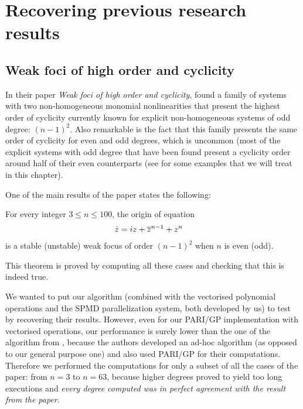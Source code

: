 \chapter{Recovering previous research results}

\section{Weak foci of high order and cyclicity \parencite{Liang2016}}

In their paper \emph{Weak foci of high order and cyclicity}, \textcite{Liang2016} found a family of systems with two non-homogeneous monomial nonlinearities that present the highest order of cyclicity currently known for explicit non-homogeneous systems of odd degree: $(n-1)^2$. Also remarkable is the fact that this family presents the same order of cyclicity for even and odd degrees, which is uncommon (most of the explicit systems with odd degree that have been found present a cyclicity order around half of their even counterparts (see  for some examples that we will treat in this chapter).

One of the main results of the paper states the following:
\begin{theorem}
For every integer $3\le n\le 100$, the origin of equation
\begin{align}
\dot z &= iz + \overline{z}^{n-1} + z^n
\end{align}
is a stable (unstable) weak focus of order $(n-1)^2$ when $n$ is even (odd).
\end{theorem}
This theorem is proved by computing all these cases and checking that this is indeed true.

We wanted to put our algorithm (combined with the vectorised polynomial operations and the SPMD parallelization system, both developed by us) to test by recovering their results. However, even for our PARI/GP implementation with vectorised operations, our performance is surely lower than the one of the algorithm from \textcite{Liang2016}, because the authors developed an ad-hoc algorithm (as opposed to our general purpose one) and also used PARI/GP for their computations. Therefore we performed the computations for only a subset of all the cases of the paper: from $n=3$ to $n=63$, because higher degrees proved to yield too long executions and \emph{every degree computed was in perfect agreement with the result from the paper}.


